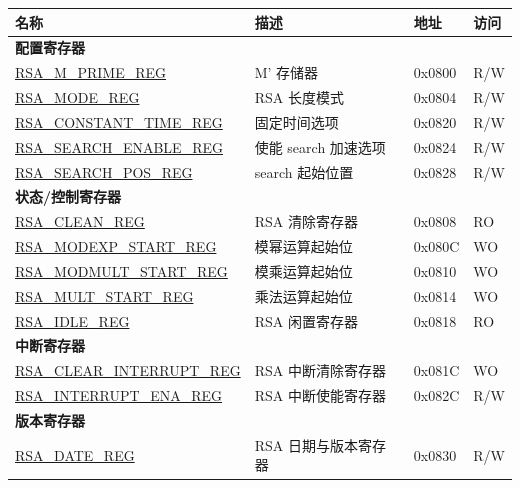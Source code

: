 \begin{longtable}{ | p{5.2cm} | p{6.6cm} | p{2cm} | p{1.2cm} | }
\hline\rowcolor{lightgray}
名称 & 描述 &  地址 & 访问 \\ \hline
\multicolumn{4}{|l|}{\textbf{配置寄存器}} \\ \hline
\hyperref[regdesc:RSAMPRIMEREG]{RSA\_M\_PRIME\_REG}                 & M' 存储器 & 0x0800 & R/W \\ \hline
\hyperref[regdesc:RSAMODEXPMODEREG]{RSA\_MODE\_REG}                     & RSA 长度模式      & 0x0804 & R/W \\ \hline
\hyperref[regdesc:RSACONSTANTTIMEREG]{RSA\_CONSTANT\_TIME\_REG}     & 固定时间选项 & 0x0820 & R/W \\ \hline
\hyperref[regdesc:RSASEARCHENABLEREG]{RSA\_SEARCH\_ENABLE\_REG}     & 使能 search 加速选项        & 0x0824 & R/W \\ \hline
\hyperref[regdesc:RSASEARCHPOSREG]{RSA\_SEARCH\_POS\_REG}           & search 起始位置      & 0x0828 & R/W \\ \hline
\multicolumn{4}{|l|}{\textbf{状态/控制寄存器}} \\ \hline
\hyperref[regdesc:RSACLEANREG]{RSA\_CLEAN\_REG}                 & RSA 清除寄存器               & 0x0808 & RO \\ \hline
\hyperref[regdesc:RSAMODEXPSTARTREG]{RSA\_MODEXP\_START\_REG}   & 模幂运算起始位 & 0x080C & WO \\ \hline
\hyperref[regdesc:RSAMODMULTSTARTREG]{RSA\_MODMULT\_START\_REG} & 模乘运算起始位 & 0x0810 & WO \\ \hline
\hyperref[regdesc:RSAMULTSTARTREG]{RSA\_MULT\_START\_REG}       & 乘法运算起始位 & 0x0814 & WO \\ \hline
\hyperref[regdesc:RSAIDLEREG]{RSA\_IDLE\_REG}                   & RSA 闲置寄存器                & 0x0818 & RO \\ \hline
\multicolumn{4}{|l|}{\textbf{中断寄存器}} \\ \hline
\hyperref[regdesc:RSACLEARINTERRUPTREG]{RSA\_CLEAR\_INTERRUPT\_REG} & RSA 中断清除寄存器  & 0x081C & WO  \\ \hline
\hyperref[regdesc:RSAINTERRUPTENAREG]{RSA\_INTERRUPT\_ENA\_REG}     & RSA 中断使能寄存器 & 0x082C & R/W \\ \hline
\multicolumn{4}{|l|}{\textbf{版本寄存器}} \\ \hline
\hyperref[regdesc:RSADATEREG]{RSA\_DATE\_REG}                   & RSA 日期与版本寄存器     & 0x0830 & R/W \\ \hline
\end{longtable}
